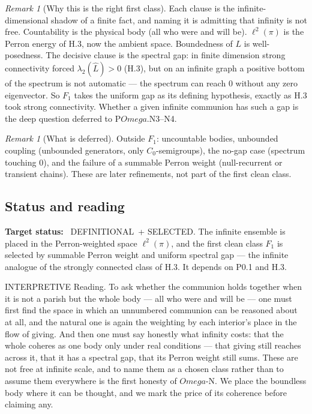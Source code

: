 \documentclass[11pt,a4paper]{article}
\def\Omega{Omega}%
\def\mathfrak#1{#1}%
\def\emph#1{#1}%
\newcommand{\stDef}{\textcolor{cDef}{\textsf{\small DEFINITIONAL}}}
\newcommand{\stSelected}{\textcolor{cSel}{\textsf{\small SELECTED}}}
\newcommand{\stInterp}{\textcolor{cInt}{\textsf{\small INTERPRETIVE}}}
\theoremstyle{definition}
\theoremstyle{plain}
\theoremstyle{remark}
\newtheorem{remark}[definition]{Remark}
\begin{document}
\begin{remark}[Why this is the right first class]\label{rem:cleanchoice}
Each clause is the infinite-dimensional shadow of a finite fact, and naming it is admitting that
infinity is not free. Countability is the physical body (all who were and will be).
\(\ell^2(\pi)\) is the Perron energy of H.3, now the ambient space. Boundedness of \(L\) is
well-posedness. The decisive clause is the spectral gap: in finite dimension strong connectivity
\emph{forced} \(\lambda_2(\widehat L)>0\) (H.3), but on an infinite graph a positive bottom of
the spectrum is \emph{not} automatic --- the spectrum can reach \(0\) without any zero
eigenvector. So \(\mathfrak F_1\) takes the uniform gap as its defining hypothesis, exactly as
H.3 took strong connectivity. Whether a given infinite communion has such a gap is the deep
question deferred to P$\Omega$.N3--N4.
\end{remark}

\begin{remark}[What is deferred]\label{rem:ndeferred}
Outside \(\mathfrak F_1\): uncountable bodies, unbounded coupling (unbounded generators, only
\(C_0\)-semigroups), the no-gap case (spectrum touching \(0\)), and the failure of a summable
Perron weight (null-recurrent or transient chains). These are later refinements, not part of the
first clean class.
\end{remark}

\subsection{Status and reading}

\textbf{Target status:}~
\stDef\ + \stSelected. The infinite ensemble is placed in the Perron-weighted space
\(\ell^2(\pi)\), and the first clean class \(\mathfrak F_1\) is selected by summable Perron
weight and uniform spectral gap --- the infinite analogue of the strongly connected class of
H.3. It depends on P0.1 and H.3.

\medskip
\stInterp\quad
\emph{Reading.}
To ask whether the communion holds together when it is not a parish but the whole body --- all
who were and will be --- one must first find the space in which an unnumbered communion can be
reasoned about at all, and the natural one is again the weighting by each interior's place in
the flow of giving. And then one must say honestly what infinity costs: that the whole coheres
as one body only under real conditions --- that giving still reaches across it, that it has a
spectral gap, that its Perron weight still sums. These are not free at infinite scale, and to
name them as a chosen class rather than to assume them everywhere is the first honesty of
$\Omega$-N. We place the boundless body where it can be thought, and we mark the price of its
coherence before claiming any.
\end{document}
